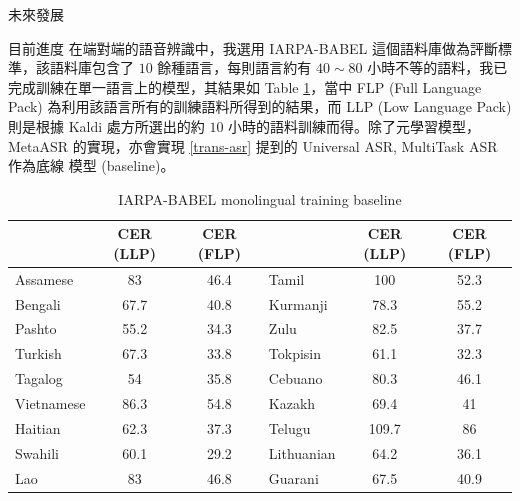 \documentclass[12pt,UTF8,fntef]{article}
\begin{document}
\begin{section}{未來發展}
  \begin{subsection}{目前進度} \label{progress}
    在端對端的語音辨識中，我選用 IARPA-BABEL 這個語料庫做為評斷標準，該語料庫包含了 $10$ 餘種語言，每則語言約有 $40 \sim 80$ 小時不等的語料，我已完成訓練在單一語言上的模型，其結果如 Table \ref{table:monoASR}，當中 FLP (Full Language Pack) 為利用該語言所有的訓練語料所得到的結果，而 LLP (Low Language Pack) 則是根據 Kaldi 處方所選出的約 $10$ 小時的語料訓練而得。除了元學習模型，MetaASR 的實現，亦會實現 \ref{trans-asr} 提到的 Universal ASR, MultiTask ASR 作為底線 模型 (baseline)。

\begin{table}[ht]
  \centering
\begin{tabular}{l|c|c|l|c|c|}
\cline{2-3} \cline{5-6}
\multicolumn{1}{c|}{}            & CER (LLP) & CER (FLP) & \multicolumn{1}{c|}{} & CER (LLP) & CER (FLP) \\ \hline
\multicolumn{1}{|l|}{Assamese}   & 83        & 46.4      & Tamil                 & 100       & 52.3      \\ \hline
\multicolumn{1}{|l|}{Bengali}    & 67.7      & 40.8      & Kurmanji              & 78.3      & 55.2      \\ \hline
\multicolumn{1}{|l|}{Pashto}     & 55.2      & 34.3      & Zulu                  & 82.5      & 37.7      \\ \hline
\multicolumn{1}{|l|}{Turkish}    & 67.3      & 33.8      & Tokpisin              & 61.1      & 32.3      \\ \hline
\multicolumn{1}{|l|}{Tagalog}    & 54        & 35.8      & Cebuano               & 80.3      & 46.1      \\ \hline
\multicolumn{1}{|l|}{Vietnamese} & 86.3      & 54.8      & Kazakh                & 69.4      & 41        \\ \hline
\multicolumn{1}{|l|}{Haitian}    & 62.3      & 37.3      & Telugu                & 109.7     & 86        \\ \hline
\multicolumn{1}{|l|}{Swahili}    & 60.1      & 29.2      & Lithuanian            & 64.2      & 36.1      \\ \hline
\multicolumn{1}{|l|}{Lao}        & 83        & 46.8      & Guarani               & 67.5      & 40.9      \\ \hline
\end{tabular}
\caption{IARPA-BABEL monolingual training baseline}
\label{table:monoASR}
\end{table}
  \end{subsection}


\end{section}
\end{document}

